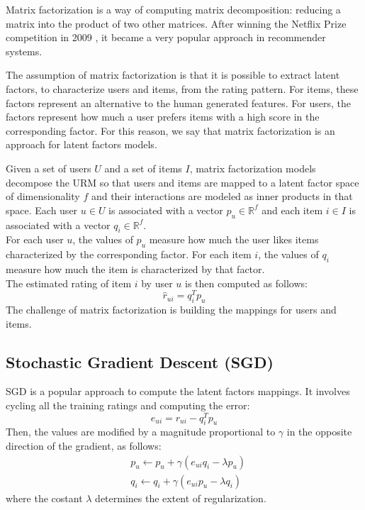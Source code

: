 Matrix factorization \cite{10.1109/MC.2009.263} is a way of computing matrix decomposition: reducing a matrix into the product of two other matrices. After winning the Netflix Prize competition in 2009 \cite{netflix-prize}, it became a very popular approach in recommender systems.\par
The assumption of matrix factorization is that it is possible to extract latent factors, to characterize users and items, from the rating pattern. For items, these factors represent an alternative to the human generated features. For users, the factors represent how much a user prefers items with a high score in the corresponding factor. For this reason, we say that matrix factorization is an approach for latent factors models.\par
Given a set of users $U$ and a set of items $I$, matrix factorization models decompose the URM so that users and items are mapped to a latent factor space of dimensionality $f$ and their interactions are modeled as inner products in that space. Each user $u \in U$ is associated with a vector $p_u \in \mathbb{R}^f$ and each item $i \in I$ is associated with a vector $q_i \in \mathbb{R}^f$.\\
For each user $u$, the values of $p_u$ measure how much the user likes items characterized by the corresponding factor. For each item $i$, the values of $q_i$ measure how much the item is characterized by that factor.\\
The estimated rating of item $i$ by user $u$ is then computed as follows:
\begin{equation*}
\hat{r}_{ui} = q_i^T p_u
\end{equation*}
The challenge of matrix factorization is building the mappings for users and items.


\subsection{Stochastic Gradient Descent (SGD)}

SGD is a popular approach \cite{ImprovingSVD, 10.1145/1401890.1401944, 10.1145/1345448.1345466} to compute the latent factors mappings. It involves cycling all the training ratings and computing the error:
\begin{equation*}
e_{ui} = r_{ui} - q_i^T p_u
\end{equation*}
Then, the values are modified by a magnitude proportional to $\gamma$ in the opposite direction of the gradient, as follows:
\begin{equation*}
\begin{split}
& p_u \gets p_u + \gamma (e_{ui} q_i - \lambda p_u) \\
& q_i \gets q_i + \gamma (e_{ui} p_u - \lambda q_i)
\end{split}
\end{equation*}
where the costant $\lambda$ determines the extent of regularization.



